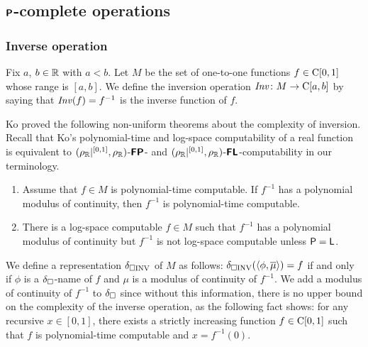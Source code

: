 \documentclass[envcountsame,orivec,oribibl]{llncs}
\begin{document}
\subsection{$\text{\bfseries \sffamily \upshape P}$-complete operations}
\label{section:P-complete}

\subsubsection{Inverse operation}

Fix $a$, $b \in \mathbb R$ with $a < b$. 
Let $M$ be the set of one-to-one functions $f \in \mathrm C[0,1]$
whose range is $[a,b]$.
We define the inversion operation $\mathit{Inv} \colon M \to \mathrm C [a, b]$ 
by saying that $\mathit{Inv} (f) = f ^{-1}$ is the inverse function of $f$. 

Ko proved the following non-uniform theorems about the complexity of inversion.
Recall that Ko's polynomial-time and log-space computability of a real function
is equivalent to $(\rho _\mathbb R|^{[0,1]}, \rho _\mathbb R)$-$\text{\bfseries \sffamily \upshape FP}$- and $(\rho _\mathbb R|^{[0,1]}, \rho _\mathbb R)$-$\text{\bfseries \sffamily \upshape FL}$-computability in our terminology. 

\begin{theorem}
\label{theorem: ko inversion}
\begin{enumerate}
\item \label{enumi:ko1991-4.7}
Assume that $f \in M$ is polynomial-time computable. 
If $f^{-1}$ has a polynomial modulus of continuity, 
then $f^{-1}$ is polynomial-time computable.
\item \label{enumi:ko1991-4.18}
There is a log-space computable $f \in M$
such that $f^{-1}$ has a polynomial modulus of continuity
but $f^{-1}$ is not log-space computable
unless $\mathsf{P} = \mathsf{L}$.
\end{enumerate}
\end{theorem}

We define a representation $\delta _{\square \mathrm{INV}}$ of $M$ as follows:
$\delta _{\square \mathrm{INV}}(\langle \phi, \overline{\mu} \rangle) = f$ 
if and only if $\phi$ is a $\delta _\square$-name of $f$ 
and $\mu$ is a modulus of continuity of $f^{-1}$.
We add a modulus of continuity of $f^{-1}$ to $\delta _\square$
since without this information, there is no upper bound on 
the complexity of the inverse operation, 
as the following fact \cite[Theorem 4.4]{ko1991complexity} shows: 
for any recursive $x \in [0, 1]$, 
there exists a strictly increasing function $f \in \mathrm C[0, 1]$ 
such that $f$ is polynomial-time computable and $x = f^{-1}(0)$.
\end{document}
